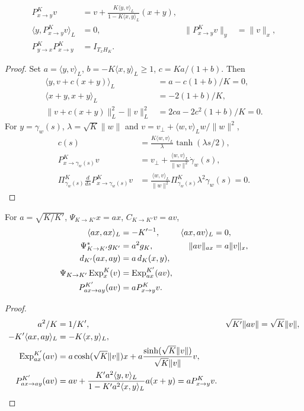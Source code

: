 \begin{proposition}
\label{prop:rigid-pt}
\begin{align}
 P_{x\to y}^Kv
 &=v+\frac{K\langle y,v\rangle_L}{1-K\langle x,y\rangle_L}(x+y),\\
 \langle y,P_{x\to y}^Kv\rangle_L&=0,&
 \|P_{x\to y}^Kv\|_y&=\|v\|_x,\\
 P_{y\to x}^KP_{x\to y}^K&=I_{T_xH_K}.
\end{align}
\end{proposition}
\begin{proof}
Set $a=\langle y,v\rangle_L$, $b=-K\langle x,y\rangle_L\ge1$,
$c=Ka/(1+b)$. Then
\begin{align}
 \langle y,v+c(x+y)\rangle_L
 &=a-c(1+b)/K=0,\\
 \langle x+y,x+y\rangle_L&=-2(1+b)/K,\\
 \|v+c(x+y)\|_L^2-\|v\|_L^2
 &=2ca-2c^2(1+b)/K=0.
\end{align}
For $y=\gamma_w(s)$, $\lambda=\sqrt K\|w\|$ and
$v=v_\perp+\langle w,v\rangle_Lw/\|w\|^2$,
\begin{align}
 c(s)&=\frac{K\langle w,v\rangle_L}{\lambda}\tanh(\lambda s/2),\\
 P_{x\to\gamma_w(s)}^Kv
 &=v_\perp+\frac{\langle w,v\rangle_L}{\|w\|^2}\dot\gamma_w(s),\\
 \Pi_{\gamma_w(s)}^K\frac d{ds}P_{x\to\gamma_w(s)}^Kv
 &=\frac{\langle w,v\rangle_L}{\|w\|^2}
   \Pi_{\gamma_w(s)}^K\lambda^2\gamma_w(s)=0.
\end{align}
\end{proof}

\begin{proposition}
\label{prop:homothety}
For $a=\sqrt{K/K'}$, $\Psi_{K\to K'}x=ax$,
$C_{K\to K'}v=av$,
\begin{align}
 \langle ax,ax\rangle_L&=-K'^{-1},&
 \langle ax,av\rangle_L&=0,\\
 \Psi_{K\to K'}^*g_{K'}&=a^2g_K,&
 \|av\|_{ax}&=a\|v\|_x,\\
 d_{K'}(ax,ay)&=a\,d_K(x,y),\\
 \Psi_{K\to K'}\operatorname{Exp}_x^K(v)&=\operatorname{Exp}_{ax}^{K'}(av),\\
 P_{ax\to ay}^{K'}(av)&=aP_{x\to y}^Kv.
\end{align}
\end{proposition}
\begin{proof}
\begin{align}
 a^2/K&=1/K',&\sqrt{K'}\|av\|&=\sqrt K\|v\|,\\
 -K'\langle ax,ay\rangle_L&=-K\langle x,y\rangle_L,\\
 \operatorname{Exp}_{ax}^{K'}(av)
 &=a\cosh(\sqrt K\|v\|)x+
 a\frac{\sinh(\sqrt K\|v\|)}{\sqrt K\|v\|}v,\\
 P_{ax\to ay}^{K'}(av)
 &=av+\frac{K'a^2\langle y,v\rangle_L}{1-K'a^2\langle x,y\rangle_L}a(x+y)
 =aP_{x\to y}^Kv.
\end{align}
\end{proof}

